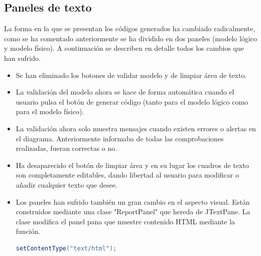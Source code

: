\subsection{Paneles de texto}
La forma en la que se presentan los códigos generados ha cambiado radicalmente, como se ha comentado anteriormente se ha dividido en dos paneles (modelo lógico y modelo físico). A continuación se describen en detalle todos los cambios que han sufrido.
\begin{itemize}
    \item Se han eliminado los botones de validar modelo y de limpiar área de texto.
    \item La validación del modelo ahora se hace de forma automática cuando el usuario pulsa el botón de generar código (tanto para el modelo lógico como para el modelo físico).
   \item La validación ahora solo muestra mensajes cuando existen errores o alertas en el diagrama. Anteriormente informaba de todas las comprobaciones realizadas, fueran correctas o no.
   \item Ha desaparecido el botón de limpiar área y en su lugar los cuadros de texto son completamente editables, dando libertad al usuario para modificar o añadir cualquier texto que desee.
   \item Los paneles han sufrido también un gran cambio en el aspecto visual. Están construidos mediante una clase "ReportPanel" que hereda de JTextPane. La clase modifica el panel pana que muestre contenido HTML mediante la función.\\
   \begin{lstlisting}[backgroundcolor = \color{white},
                   xleftmargin = 2cm,language=java,basicstyle=\medium]
        setContentType("text/html");\end{lstlisting}
        


\end{itemize}
